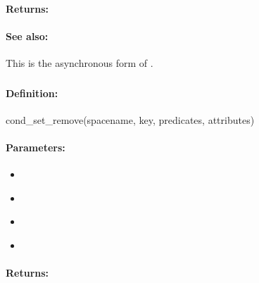\paragraph{Returns:}


\paragraph{See also:}  This is the asynchronous form of .

\pagebreak
\subsubsection{}
\label{api:ruby:cond_set_remove}


\paragraph{Definition:}
\begin{rubycode}
cond_set_remove(spacename, key, predicates, attributes)
\end{rubycode}

\paragraph{Parameters:}
\begin{itemize}[noitemsep]
\item {}\\

\item {}\\

\item {}\\

\item {}\\

\end{itemize}

\paragraph{Returns:}


